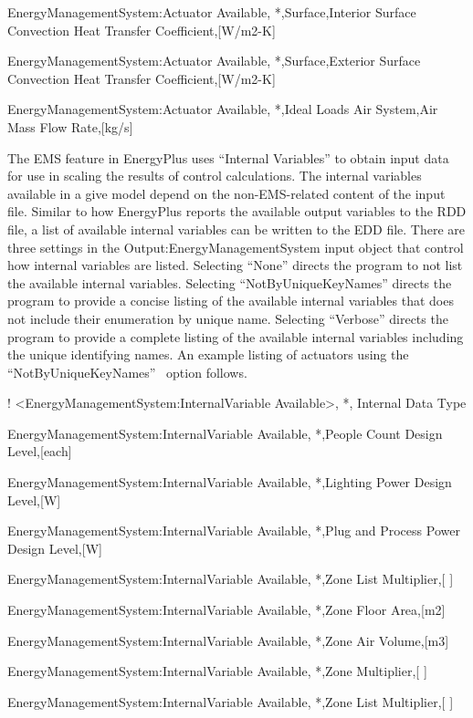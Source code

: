 EnergyManagementSystem:Actuator Available, *,Surface,Interior Surface Convection Heat Transfer Coefficient,{[}W/m2-K{]}

EnergyManagementSystem:Actuator Available, *,Surface,Exterior Surface Convection Heat Transfer Coefficient,{[}W/m2-K{]}

EnergyManagementSystem:Actuator Available, *,Ideal Loads Air System,Air Mass Flow Rate,{[}kg/s{]}

The EMS feature in EnergyPlus uses ``Internal Variables'' to obtain input data for use in scaling the results of control calculations. The internal variables available in a give model depend on the non-EMS-related content of the input file. Similar to how EnergyPlus reports the available output variables to the RDD file, a list of available internal variables can be written to the EDD file. There are three settings in the Output:EnergyManagementSystem input object that control how internal variables are listed. Selecting ``None'' directs the program to not list the available internal variables. Selecting ``NotByUniqueKeyNames'' directs the program to provide a concise listing of the available internal variables that does not include their enumeration by unique name. Selecting ``Verbose'' directs the program to provide a complete listing of the available internal variables including the unique identifying names. An example listing of actuators using the~ ``NotByUniqueKeyNames''~ option follows.

! \textless{}EnergyManagementSystem:InternalVariable Available\textgreater{}, *, Internal Data Type

EnergyManagementSystem:InternalVariable Available, *,People Count Design Level,{[}each{]}

EnergyManagementSystem:InternalVariable Available, *,Lighting Power Design Level,{[}W{]}

EnergyManagementSystem:InternalVariable Available, *,Plug and Process Power Design Level,{[}W{]}

EnergyManagementSystem:InternalVariable Available, *,Zone List Multiplier,{[} {]}

EnergyManagementSystem:InternalVariable Available, *,Zone Floor Area,{[}m2{]}

EnergyManagementSystem:InternalVariable Available, *,Zone Air Volume,{[}m3{]}

EnergyManagementSystem:InternalVariable Available, *,Zone Multiplier,{[} {]}

EnergyManagementSystem:InternalVariable Available, *,Zone List Multiplier,{[} {]}

